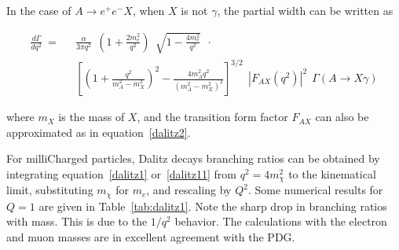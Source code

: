 \documentclass[12pt]{article}
\begin{document}
In the case of $A \to e^+ e^- X$, when $X$ is not $\gamma$, the
partial width can be written as 

\begin{equation}
\begin{split}
\frac{d \Gamma}{d q^2}  ~=~~~ & \frac{\alpha}{3 \pi q^2}~~
(1+\frac{2m_e^2}{q^2})~~\sqrt{1 - \frac{4m_e^2}{q^2}}~~ \cdot \\
& \left [ (1+\frac{q^2}{m_A^2-m_X^2})^2 - \frac{4
    m_A^2q^2}{(m_A^2-m_X^2)^2}\right ]^{3/2}~~
|F_{AX}(q^2)|^2 ~~
\Gamma(A \to X \gamma) 
\label{dalitz11}
\end{split}
\end{equation}

\noindent where $m_X$ is the mass of $X$, and the
transition
form factor $F_{AX}$ can also be approximated as in equation~\ref{dalitz2}.

For milliCharged particles, Dalitz decays branching ratios 
can be obtained by integrating equation~\ref{dalitz1} or~\ref{dalitz11}
from 
$q^2=4m^2_\chi$ to the kinematical limit, substituting $m_\chi$ for 
$m_e$, and rescaling by $Q^2$.
Some numerical results for $Q=1$ are given in Table~\ref{tab:dalitz1}.  Note the
sharp drop in branching ratios with mass.  This is due to the $1/q^2$ behavior.
The calculations
with the electron and muon masses are in excellent agreement with the PDG.
\end{document}
